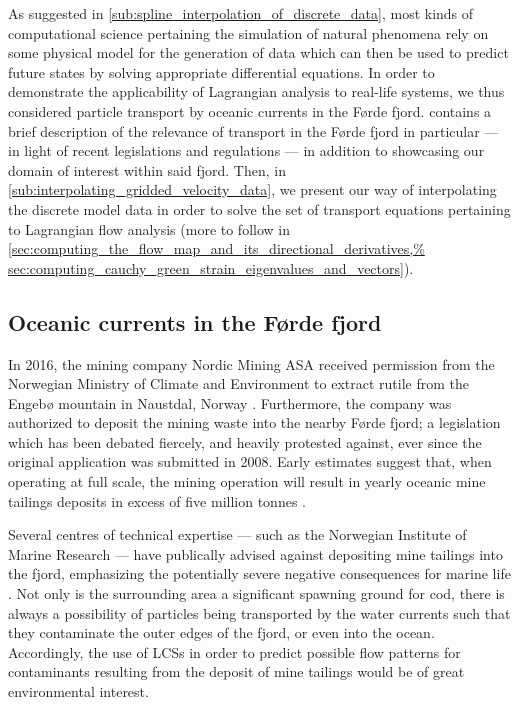 As suggested in \cref{sub:spline_interpolation_of_discrete_data}, most kinds of
computational science pertaining the simulation of natural phenomena rely on
some physical model for the generation of data which can then be used to
predict future states by solving appropriate differential equations. In order
to demonstrate the applicability of Lagrangian analysis to real-life systems,
we thus considered particle transport by oceanic currents in the Førde fjord.
 contains a brief description of
the relevance of transport in the Førde fjord in particular --- in light of
recent legislations and regulations --- in addition to showcasing our domain of
interest within said fjord. Then, in
\cref{sub:interpolating_gridded_velocity_data}, we present our way of
interpolating the discrete model data in order to solve the set of transport
equations pertaining to Lagrangian flow analysis (more to follow in
\cref{sec:computing_the_flow_map_and_its_directional_derivatives,%
sec:computing_cauchy_green_strain_eigenvalues_and_vectors}).

\subsection{Oceanic currents in the Førde fjord}
\label{sub:oceanic_currents_in_the_forde_fjord}

In 2016, the mining company Nordic Mining ASA received permission from the
Norwegian Ministry of Climate and Environment to extract rutile from the
Engebø mountain in Naustdal, Norway \parencite{garvik2017gruvekonflikten,%
haugan2015sjodeponi}. Furthermore, the company was authorized to deposit
the mining waste into the nearby Førde fjord; a legislation which has been
debated fiercely, and heavily protested against, ever since the original
application was submitted in 2008. Early estimates suggest that, when operating
at full scale, the mining operation will result in yearly oceanic mine tailings
deposits in excess of five million tonnes \parencite{garvik2017gruvekonflikten}.

Several centres of technical expertise --- such as the Norwegian Institute of
Marine Research --- have publically advised against depositing mine tailings
into the fjord, emphasizing the potentially severe negative consequences
for marine life \parencite{haugan2015sjodeponi}. Not only is the surrounding
area a significant spawning ground for cod, there is always a possibility of
particles being transported by the water currents such that they contaminate
the outer edges of the fjord, or even into the ocean. Accordingly, the use of
LCSs in order to predict possible flow patterns for contaminants resulting from
the deposit of mine tailings would be of great environmental interest.

